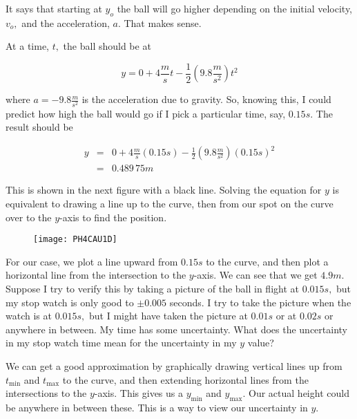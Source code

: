 It says that starting at $y_{o}$ the ball will go higher depending on the initial velocity, $v_{o},$ and the acceleration, $a.$ That makes sense.

At a time, $t,$ the ball should be at 

\begin{equation*}
	y=0+4\frac{\unit{m}}{\unit{s}}t-\frac{1}{2}\left( 9.8\frac{\unit{m}}{\unit{s}^{2}}\right) t^{2}
\end{equation*}

where $a=-9.8\frac{\unit{m}}{\unit{s}^{2}}$ is the acceleration due to gravity. So, knowing this, I could predict how high the ball would go if I pick a particular time, say, $0.15\unit{s}.$ The result should be

\begin{eqnarray*}
	y &=&0+4\frac{\unit{m}}{\unit{s}}\left( 0.15\unit{s}\right) -\frac{1}{2} \left( 9.8\frac{\unit{m}}{\unit{s}^{2}}\right) \left( 0.15\unit{s}\right) ^{2} \\
      &=&0.489\,75\unit{m}
\end{eqnarray*}

This is shown in the next figure with a black line. Solving the equation for $y$ is equivalent to drawing a line up to the curve, then from our spot on the curve over to the $y$-axis to find the position.

\begin{figure}[h!]
	\centering
    \texttt{[image: PH4CAU1D]}
\end{figure}

For our case, we plot a line upward from $0.15\unit{s}$ to the curve, and then plot a horizontal line from the intersection to the $y$-axis. We can see that we get $4.9\unit{m}.$ Suppose I try to verify this by taking a picture of the ball in flight at $0.015\unit{s},$ but my stop watch is only
good to $\pm 0.005$ seconds. I try to take the picture when the watch is at $0.015\unit{s},$ but I might have taken the picture at $0.01\unit{s}$ or at $0.02\unit{s}$ or anywhere in between. My time has some uncertainty. What does the uncertainty in my stop watch time mean for the uncertainty in my $y$ value?

We can get a good approximation by graphically drawing vertical lines up from $t_{\min }$ and $t_{\max }$ to the curve, and then extending horizontal lines from the intersections to the $y$-axis. This gives us a $y_{\min }$ and $y_{\max }.$ Our actual height could be anywhere in between these. This is a way to view our uncertainty in $y.$

